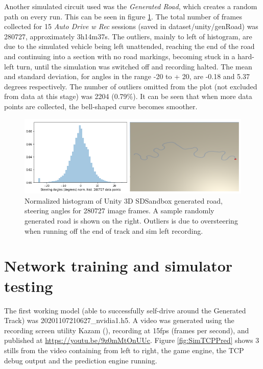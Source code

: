 Another simulated circuit used was the \textit{Generated Road}, which creates a random path on every run. This can be seen in figure \ref{fig:GeneratedRoadPlusHist}. The total number of frames collected for 15 \textit{Auto Drive w Rec} sessions (saved in dataset/unity/genRoad) was 280727, approximately 3h14m37s. The outliers, mainly to left of histogram, are due to the simulated vehicle being left unattended, reaching the end of the road and continuing into a section with no road markings, becoming stuck in a hard-left turn, until the simulation was switched off and recording halted. The mean and standard deviation, for angles in the range -20 to + 20, are -0.18 and 5.37 degrees respectively. The number of outliers omitted from the plot (not excluded from data at this stage) was 2204 (0.79\%). It can be seen that when more data points are collected, the bell-shaped curve becomes smoother.

\begin{figure}[ht]
 \centering 
 \includegraphics[width=\textwidth]{Figures/GeneratedRoadPlusHistogram.png}
 \caption{Normalized histogram of Unity 3D SDSandbox generated road, steering angles for 280727 image frames. A sample randomly generated road is shown on the right. Outliers is due to oversteering when running off the end of track and sim left recording.}
 \label{fig:GeneratedRoadPlusHist}
\end{figure}



\section{Network training and simulator testing}
\label{results:net-training} 
The first working model (able to successfully self-drive around the Generated Track) was   20201107210627\_nvidia1.h5. A video was generated using the recording screen utility Kazam (\cite{Kazam2020}), recording at 15fps (frames per second), and published at  \href{https://youtu.be/9z0mMtOnUUc}{https://youtu.be/9z0mMtOnUUc}. Figure \ref{fig:SimTCPPred}
shows 3 stills from the video containing from left to right, the game engine, the TCP debug output and the prediction engine running.

